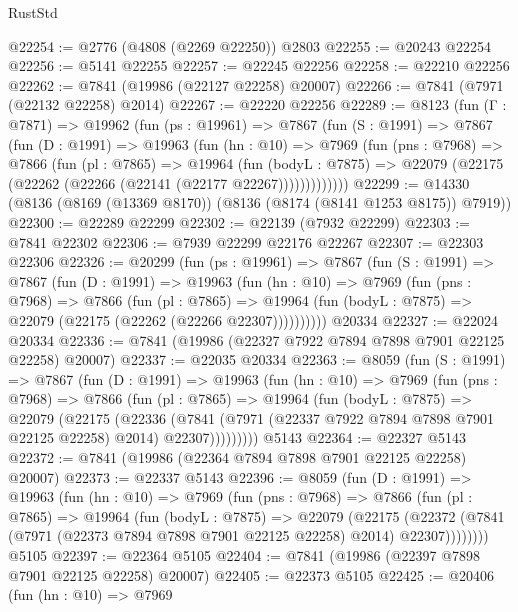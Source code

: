 \begin{lexlean}{RustStd}
\begin{coremodule}
{\begin{coremodule}
{{{{{{{{{{{{{{{{{{{{{{{{{{{{{{{{{{{{{{{{{{{{{{{{{{{{{{@22254 := @2776 (@4808 (@2269 @22250)) @2803
@22255 := @20243 @22254
@22256 := @5141 @22255
@22257 := @22245 @22256
@22258 := @22210 @22256
@22262 := @7841 (@19986 (@22127 @22258) @20007)
@22266 := @7841 (@7971 (@22132 @22258) @2014)
@22267 := @22220 @22256
@22289 := @8123
    (fun (Γ : @7871) =>
    @19962
      (fun (ps : @19961) =>
      @7867
        (fun (S : @1991) =>
        @7867
          (fun (D : @1991) =>
          @19963
            (fun (hn : @10) =>
            @7969
              (fun (pns : @7968) =>
              @7866
                (fun (pl : @7865) =>
                @19964
                  (fun (bodyL : @7875) =>
                  @22079 (@22175 (@22262 (@22266 (@22141 (@22177 @22267)))))))))))))
@22299 := @14330 (@8136 (@8169 (@13369 @8170)) (@8136 (@8174 (@8141 @1253 @8175)) @7919))
@22300 := @22289 @22299
@22302 := @22139 (@7932 @22299)
@22303 := @7841 @22302
@22306 := @7939 @22299 @22176 @22267
@22307 := @22303 @22306
@22326 := @20299
    (fun (ps : @19961) =>
    @7867
      (fun (S : @1991) =>
      @7867
        (fun (D : @1991) =>
        @19963
          (fun (hn : @10) =>
          @7969
            (fun (pns : @7968) =>
            @7866
              (fun (pl : @7865) =>
              @19964 (fun (bodyL : @7875) => @22079 (@22175 (@22262 (@22266 @22307))))))))))
    @20334
@22327 := @22024 @20334
@22336 := @7841 (@19986 (@22327 @7922 @7894 @7898 @7901 @22125 @22258) @20007)
@22337 := @22035 @20334
@22363 := @8059
    (fun (S : @1991) =>
    @7867
      (fun (D : @1991) =>
      @19963
        (fun (hn : @10) =>
        @7969
          (fun (pns : @7968) =>
          @7866
            (fun (pl : @7865) =>
            @19964
              (fun (bodyL : @7875) =>
              @22079
                (@22175
                  (@22336
                    (@7841
                      (@7971 (@22337 @7922 @7894 @7898 @7901 @22125 @22258) @2014)
                      @22307)))))))))
    @5143
@22364 := @22327 @5143
@22372 := @7841 (@19986 (@22364 @7894 @7898 @7901 @22125 @22258) @20007)
@22373 := @22337 @5143
@22396 := @8059
    (fun (D : @1991) =>
    @19963
      (fun (hn : @10) =>
      @7969
        (fun (pns : @7968) =>
        @7866
          (fun (pl : @7865) =>
          @19964
            (fun (bodyL : @7875) =>
            @22079
              (@22175
                (@22372 (@7841 (@7971 (@22373 @7894 @7898 @7901 @22125 @22258) @2014) @22307))))))))
    @5105
@22397 := @22364 @5105
@22404 := @7841 (@19986 (@22397 @7898 @7901 @22125 @22258) @20007)
@22405 := @22373 @5105
@22425 := @20406
    (fun (hn : @10) =>
    @7969
}}}}}}}}}}}}}}}}}}}}}}}}}}}}}}}}}}}}}}}}}}}}}}}}}}}}}}
\end{coremodule}}
\end{coremodule}
\end{lexlean}

